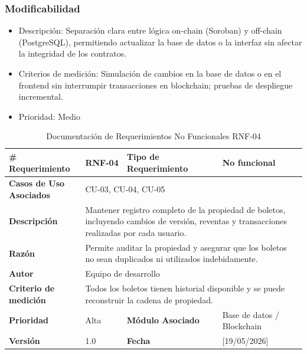 \documentclass[12pt,letterpaper]{article}
\begin{document}
\subsubsection{Modificabilidad}
\begin{itemize}
    \item Descripción: Separación clara entre lógica on-chain (Soroban) y off-chain (PostgreSQL), permitiendo actualizar la base de datos o la interfaz sin afectar la integridad de los contratos.
    \item Criterios de medición: Simulación de cambios en la base de datos o en el frontend sin interrumpir transacciones en blockchain; pruebas de despliegue incremental.
    \item Prioridad: Medio
\end{itemize}
\begin{table}[H]
\centering
\scriptsize
\renewcommand{\arraystretch}{1.2}
\setlength{\tabcolsep}{4pt}

\begin{tabularx}{\textwidth}{|p{3cm}|X|p{3.2cm}|X|}
\hline
\textbf{\# Requerimiento} & RNF-04 & \textbf{Tipo de Requerimiento} & No funcional \\ \hline

\textbf{Casos de Uso Asociados} & \multicolumn{3}{X|}{CU-03, CU-04, CU-05} \\ \hline

\textbf{Descripción} & 
\multicolumn{3}{p{\dimexpr\textwidth-6cm-12\tabcolsep-4\arrayrulewidth\relax}|}{Mantener registro completo de la propiedad de boletos, incluyendo cambios de versión, reventas y transacciones realizadas por cada usuario.} \\ \hline

\textbf{Razón} & 
\multicolumn{3}{p{\dimexpr\textwidth-6cm-12\tabcolsep-4\arrayrulewidth\relax}|}{Permite auditar la propiedad y asegurar que los boletos no sean duplicados ni utilizados indebidamente.} \\ \hline

\textbf{Autor} & \multicolumn{3}{X|}{Equipo de desarrollo} \\ \hline

\textbf{Criterio de medición} & 
\multicolumn{3}{p{\dimexpr\textwidth-6cm-12\tabcolsep-4\arrayrulewidth\relax}|}{Todos los boletos tienen historial disponible y se puede reconstruir la cadena de propiedad.} \\ \hline

\textbf{Prioridad} & Alta & \textbf{Módulo Asociado} & Base de datos / Blockchain \\ \hline

\textbf{Versión} & 1.0 & \textbf{Fecha} & [19/05/2026] \\ \hline

\end{tabularx}

\caption{Documentación de Requerimientos No Funcionales RNF-04}
\label{tab:documentacion_rnf04}
\normalsize
\end{table}
\end{document}

